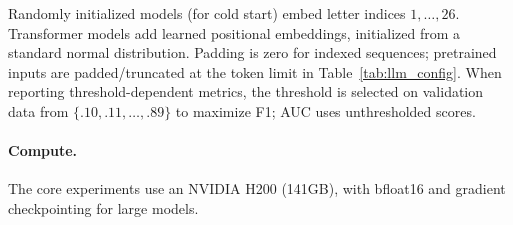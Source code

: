 \documentclass{article} %
\theoremstyle{plain}
\theoremstyle{definition}
\theoremstyle{remark}
\begin{document}
Randomly initialized models (for cold start) embed letter indices $1,\ldots,26$. Transformer models add learned positional embeddings, initialized from a standard normal distribution. Padding is zero for indexed sequences; pretrained inputs are padded/truncated at the token limit in Table~\ref{tab:llm_config}. When reporting threshold-dependent metrics, the threshold is selected on validation data from $\{.10,.11,\ldots,.89\}$ to maximize F1; AUC uses unthresholded scores.

\paragraph{Compute.}
\label{appendix:hardware}
The core experiments use an NVIDIA H200 (141GB), with bfloat16 and gradient checkpointing for large models.

\FloatBarrier

\FloatBarrier
\end{document}
